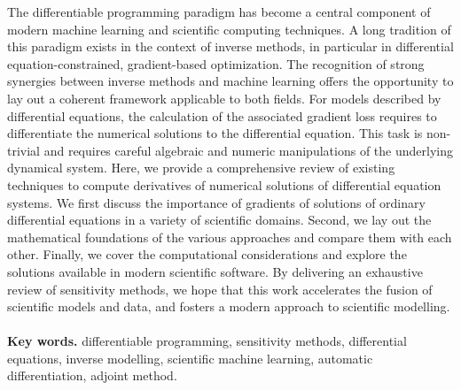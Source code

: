 The differentiable programming paradigm has become a central component of modern machine learning and scientific computing techniques. 
A long tradition of this paradigm exists in the context of inverse methods, in particular in differential equation-constrained, gradient-based optimization.
The recognition of strong synergies between inverse methods and machine learning offers the opportunity to lay out a coherent framework applicable to both fields.
For models described by differential equations, the calculation of the associated gradient loss requires to differentiate the numerical solutions to the differential equation. 
This task is non-trivial and requires careful algebraic and numeric manipulations of the underlying dynamical system.
Here, we provide a comprehensive review of existing techniques to compute derivatives of numerical solutions of differential equation systems.
We first discuss the importance of gradients of solutions of ordinary differential equations in a variety of scientific domains.
Second, we lay out the mathematical foundations of the various approaches and compare them with each other. 
Finally, we cover the computational considerations and explore the solutions available in modern scientific software. 
By delivering an exhaustive review of sensitivity methods, we hope that this work accelerates the fusion of scientific models and data, and fosters a modern approach to scientific modelling.
\\ \\
\noindent \textbf{Key words.} differentiable programming, sensitivity methods, differential equations, inverse modelling, scientific machine learning, automatic differentiation, adjoint method.
